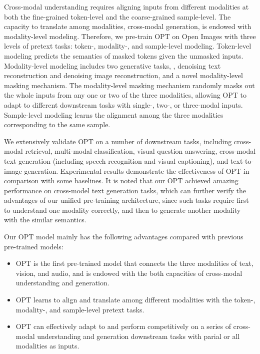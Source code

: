 \documentclass[10pt,twocolumn,letterpaper]{article}
\begin{document}
Cross-modal understanding requires aligning inputs from different modalities at both the fine-grained token-level and the coarse-grained sample-level. The capacity to translate among modalities, \ie cross-modal generation, is endowed with modality-level modeling. Therefore, we pre-train OPT on Open Images with three levels of pretext tasks: token-, modality-, and sample-level modeling. Token-level modeling predicts the semantics of masked tokens given the unmasked inputs. Modality-level modeling includes two generative tasks, \ie, denoising text reconstruction and denoising image reconstruction, and a novel modality-level masking mechanism. The modality-level masking mechanism randomly masks out the whole inputs from any one or two of the three modalities, allowing OPT to adapt to different downstream tasks with single-, two-, or three-modal inputs. Sample-level modeling learns the alignment among the three modalities corresponding to the same sample.

We extensively validate OPT on a number of downstream tasks, including cross-modal retrieval, multi-modal classification, visual question answering, cross-modal text generation (including speech recognition and visual captioning), and text-to-image generation. Experimental results demonstrate the effectiveness of OPT in comparison with some baselines. It is noted that our OPT achieved amazing performance on cross-model text generation tasks, which can further verify the advantages of our unified pre-training architecture, since such tasks require first to understand one modality correctly, and then to generate another modality with the similar semantics. 

Our OPT model mainly has the following advantages compared with previous pre-trained models:
\begin{itemize}
  \item OPT is the first pre-trained model that connects the three modalities of text, vision, and audio, and is endowed with the both capacities of cross-modal understanding and generation. 
  \item OPT learns to align and translate among different modalities with the token-, modality-, and sample-level pretext tasks.
  \item OPT can effectively adapt to and perform competitively on a series of cross-modal understanding and generation downstream tasks with parial or all modalities as inputs. 
\end{itemize}
\end{document}
